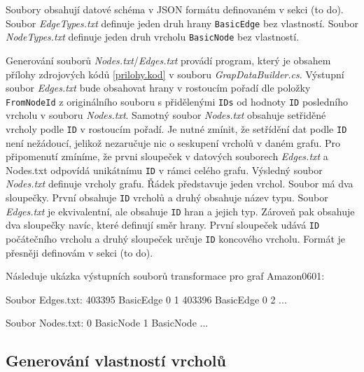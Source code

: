 Soubory obsahují datové schéma v JSON formátu definovaném v sekci (to do). 
Soubor \textit{EdgeTypes.txt} definuje jeden druh hrany \texttt{BasicEdge} bez vlastností.
Soubor \textit{NodeTypes.txt} definuje jeden druh vrcholu \texttt{BasicNode} bez vlastností.

Generování souborů \textit{Nodes.txt}/\textit{Edges.txt} provádí program, který je obsahem přílohy zdrojových kódů \ref{prilohy.kod} v souboru \textit{GrapDataBuilder.cs}.
Výstupní soubor \textit{Edges.txt} bude obsahovat hrany v rostoucím pořadí dle položky \verb+FromNodeId+ z originálního souboru s přidělenými \verb+IDs+ od hodnoty \verb+ID+ posledního vrcholu v souboru \textit{Nodes.txt}.
Samotný soubor \textit{Nodes.txt} obsahuje setřiděné vrcholy podle \verb+ID+ v rostoucím pořadí. Je nutné zmínit, že setřídění dat podle \verb+ID+ není nežádoucí, jelikož nezaručuje nic o seskupení vrcholů v daném grafu.
Pro připomenutí zmíníme, že prvni sloupeček v datových souborech \textit{Edges.txt} a Nodes.txt odpovídá unikátnímu \verb+ID+ v rámci celého grafu.
Výsledný soubor \textit{Nodes.txt} definuje vrcholy grafu. Řádek představuje jeden vrchol.
Soubor má dva sloupečky. 
První obsahuje \verb+ID+ vrcholů a druhý obsahuje název typu.
Soubor \textit{Edges.txt} je ekvivalentní, ale obsahuje \verb+ID+ hran a jejich typ.
Zároveň pak obsahuje dva sloupečky navíc, které definují směr hrany.
První sloupeček udává \verb+ID+ počátečního vrcholu a druhý sloupeček určuje \verb+ID+ koncového vrcholu.
Formát je přesněji definovám v sekci (to do).

Následuje ukázka výstupních souborů transformace pro graf Amazon0601:  
\begin{code}
Soubor Edges.txt:
403395 BasicEdge 0 1
403396 BasicEdge 0 2
...

Soubor Nodes.txt:
0 BasicNode 
1 BasicNode 
...
\end{code}

\subsection{Generování vlastností vrcholů}

